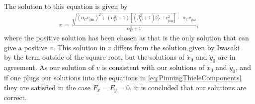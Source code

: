 The solution to this equation is given by
\begin{align}
v = \frac{\sqrt{(\alpha_Cv_{\textrm{pin}})^2+(\alpha_C^2+1)\left[(\beta_C^2+1)b_J^2-v_{\textrm{pin}}^2\right]}-\alpha_Cv_{\textrm{pin}}}{\alpha_C^2+1},
\end{align}
where the positive solution has been chosen as that is the only solution that can give a positive $v$. This solution in $v$ differs from the solution given by Iwasaki \etal~\cite{IwasakiNagaosa2013} by the term outside of the square root, but the solutions of $\dot{x}_0$ and $\dot{y}_0$ are in agreement. As our solution of $v$ is consistent with our solutions of $\dot{x}_0$ and $\dot{y}_0$, and if one plugs our solutions into the equations in \eqref{eq:PinningThieleComponents} they are satisfied in the case $F_x = F_y = 0$, it is concluded that our solutions are correct. 

